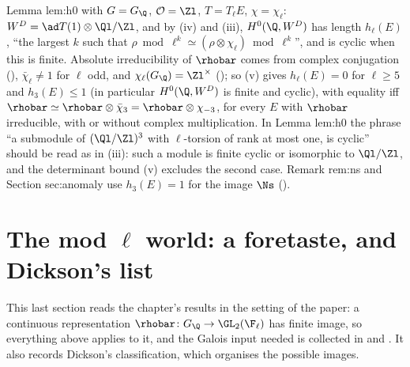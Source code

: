 \begin{paperlink}
Lemma lem:h0 with $G=G_\Q$, $\mathcal{O}=\Zl$, $T=T_\ell E$, $\chi=\chi_\ell$: $W^D=\ad T(1)\otimes\Ql/\Zl$, and by (iv) and (iii), $H^0(\Q,W^D)$ has length
$h_\ell(E)$, ``the largest $k$ such that $\rho\bmod\ell^k\simeq(\rho\otimes\chi_\ell)\bmod\ell^k$'', and is cyclic when this is finite. Absolute irreducibility of $\rhobar$ comes from complex conjugation
(), $\bar\chi_\ell\ne1$ for $\ell$ odd, and $\chi_\ell(G_\Q)=\Zl^\times$ (); so (v) gives $h_\ell(E)=0$ for $\ell\ge5$ and
$h_3(E)\le1$ (in particular $H^0(\Q,W^D)$ is finite and cyclic), with equality iff $\rhobar\simeq\rhobar\otimes\bar\chi_3=\rhobar\otimes\chi_{-3}$, for every $E$ with $\rhobar$ irreducible, with or without complex multiplication.
In Lemma lem:h0 the phrase ``a submodule of $(\Ql/\Zl)^3$ with $\ell$-torsion of rank at most one, is cyclic'' should be read as in (iii): such a
module is finite cyclic or isomorphic to $\Ql/\Zl$, and the determinant bound (v) excludes the second case. Remark rem:ns and Section
sec:anomaly use $h_3(E)=1$ for the image $\Ns$ ().
\end{paperlink}

\section{The mod \texorpdfstring{$\ell$}{l} world: a foretaste, and Dickson's list}\label{sec:reps:modl}

This last section reads the chapter's results in the setting of the paper: a continuous representation
$\rhobar\colon G_\Q\to\GL_2(\F_\ell)$ has finite image, so everything above applies to it, and the Galois input needed is collected in
 and . It also records Dickson's classification, which organises the possible images.

